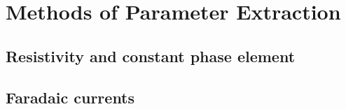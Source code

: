 
\section{Methods of Parameter Extraction}
  \subsection{Resistivity and constant phase element}
  \subsection{Faradaic currents}

